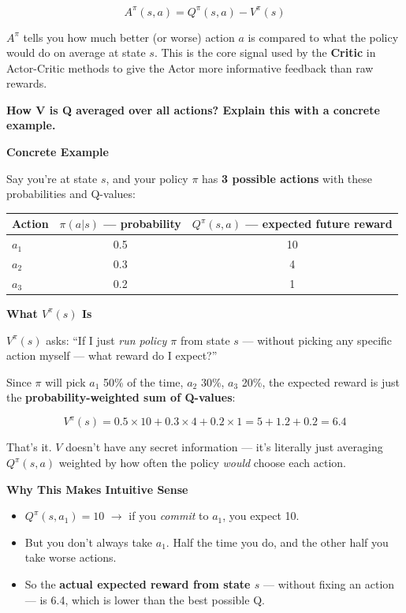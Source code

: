 \[
A^\pi(s, a) = Q^\pi(s, a) - V^\pi(s)
\]

$A^\pi$ tells you how much better (or worse) action $a$ is compared to what the policy would do on average at state $s$. This is the core signal used by the \textbf{Critic} in Actor-Critic methods to give the Actor more informative feedback than raw rewards.

\bigskip


\textbf{How V is Q averaged over all actions? Explain this with a concrete example.}

\medskip

\textbf{Concrete Example}

Say you're at state $s$, and your policy $\pi$ has \textbf{3 possible actions} with these probabilities and Q-values:

\begin{center}
\begin{tabular}{lcc}
\hline
Action & $\pi(a|s)$ --- probability & $Q^\pi(s, a)$ --- expected future reward \\
\hline
$a_1$ & 0.5 & 10 \\
$a_2$ & 0.3 & 4  \\
$a_3$ & 0.2 & 1  \\
\hline
\end{tabular}
\end{center}

\medskip

\textbf{What $V^\pi(s)$ Is}

$V^\pi(s)$ asks: ``If I just \textit{run policy $\pi$} from state $s$ --- without picking any specific action myself --- what reward do I expect?''

Since $\pi$ will pick $a_1$ 50\% of the time, $a_2$ 30\%, $a_3$ 20\%, the expected reward is just the \textbf{probability-weighted sum of Q-values}:

\[
V^\pi(s) = 0.5 \times 10 + 0.3 \times 4 + 0.2 \times 1 = 5 + 1.2 + 0.2 = \mathbf{6.4}
\]

That's it. $V$ doesn't have any secret information — it's literally just averaging $Q^\pi(s, a)$ weighted by how often the policy \textit{would} choose each action.

\medskip

\textbf{Why This Makes Intuitive Sense}

\begin{itemize}
    \item $Q^\pi(s, a_1) = 10$ $\to$ if you \textit{commit} to $a_1$, you expect 10.
    \item But you don't always take $a_1$. Half the time you do, and the other half you take worse actions.
    \item So the \textbf{actual expected reward from state $s$} --- without fixing an action --- is 6.4, which is lower than the best possible Q.
\end{itemize}


